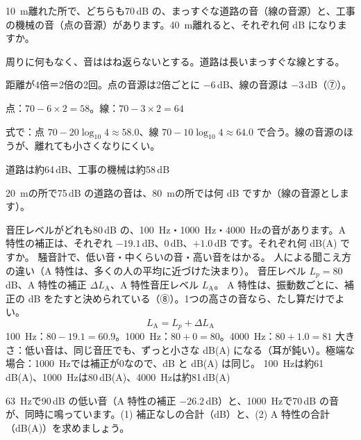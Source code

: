 \begin{reidai}[道路の音と工事の音]
\label{ph:波-9:ex11}\qty{10}{m}離れた所で、どちらも70\,dB の、まっすぐな道路の音（線の音源）と、工事の機械の音（点の音源）があります。\qty{40}{m}離れると、それぞれ何 dB になりますか。
\par{} 周りに何もなく、音ははね返らないとする。道路は長いまっすぐな線とする。
\par\kangaekata 距離が4倍＝2倍の2回。点の音源は2倍ごとに $-6$\,dB、線の音源は $-3$\,dB（⑦）。
\par\shiki 点：$70-6\times2=58$。線：$70-3\times2=64$
\par{} 式で：点 $70-20\log_{10}4\approx58.0$、線 $70-10\log_{10}4\approx64.0$ で合う。線の音源のほうが、離れても小さくなりにくい。
\par\kotae 道路は約64\,dB、工事の機械は約58\,dB
\end{reidai}
\begin{jibun}
\qty{20}{m}の所で75\,dB の道路の音は、\qty{80}{m}の所では何 dB ですか（線の音源とします）。
\end{jibun}

\begin{phreidai}[低い音は小さく聞こえる：A 特性]
\label{ph:波-9:ex12}音圧レベルがどれも80\,dB の、\qty{100}{Hz}・\qty{1000}{Hz}・\qty{4000}{Hz}の音があります。A 特性の補正は、それぞれ $-19.1$\,dB、0\,dB、$+1.0$\,dB です。それぞれ何 dB(A) ですか。
\phbamen
騒音計で、低い音・中くらいの音・高い音をはかる。
\phmushi
人による聞こえ方の違い（A 特性は、多くの人の平均に近づけた決まり）。
\phzu
音圧レベル $L_p=80$\,dB、A 特性の補正 $\Delta L_{\mathrm A}$、A 特性音圧レベル $L_{\mathrm A}$。
\phriyu
A 特性は、振動数ごとに、補正の dB をたすと決められている（⑧）。1つの高さの音なら、たし算だけでよい。
\phtateru
\[ L_{\mathrm A}=L_p+\Delta L_{\mathrm A} \]
\phtoku
\qty{100}{Hz}：$80-19.1=60.9$。\qty{1000}{Hz}：$80+0=80$。\qty{4000}{Hz}：$80+1.0=81$
\phtashikame
大きさ：低い音は、同じ音圧でも、ずっと小さな dB(A) になる（耳が鈍い）。極端な場合：\qty{1000}{Hz}では補正が0なので、dB と dB(A) は同じ。
\kotae \qty{100}{Hz}は約61\,dB(A)、\qty{1000}{Hz}は80\,dB(A)、\qty{4000}{Hz}は約81\,dB(A)
\end{phreidai}
\begin{jibun}
\qty{63}{Hz}で90\,dB の低い音（A 特性の補正 $-26.2$\,dB）と、\qty{1000}{Hz}で70\,dB の音が、同時に鳴っています。(1) 補正なしの合計（dB）と、(2) A 特性の合計（dB(A)）を求めましょう。
\end{jibun}

